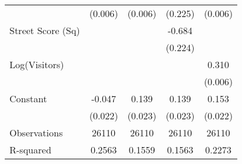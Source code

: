 {\begin{tabular}{l*{4}{c}}
                    &     (0.006)         &     (0.006)         &     (0.225)         &     (0.006)         \\
Street Score (Sq)   &                     &                     &      -0.684\sym{***}&                     \\
                    &                     &                     &     (0.224)         &                     \\
Log(Visitors)       &                     &                     &                     &       0.310\sym{***}\\
                    &                     &                     &                     &     (0.006)         \\
Constant            &      -0.047\sym{**} &       0.139\sym{***}&       0.139\sym{***}&       0.153\sym{***}\\
                    &     (0.022)         &     (0.023)         &     (0.023)         &     (0.022)         \\
\midrule
Observations        &       26110         &       26110         &       26110         &       26110         \\
R-squared           &      0.2563         &      0.1559         &      0.1563         &      0.2273         \\
\bottomrule
\end{tabular}
}
